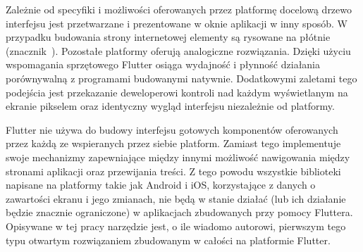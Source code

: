Zależnie od specyfiki i możliwości oferowanych przez platformę docelową drzewo interfejsu jest przetwarzane i prezentowane w oknie aplikacji w inny sposób. W przypadku budowania strony internetowej elementy są rysowane na płótnie (znacznik~). Pozostałe platformy oferują analogiczne rozwiązania. Dzięki użyciu wspomagania sprzętowego Flutter osiąga wydajność i płynność działania porównywalną z programami budowanymi natywnie. Dodatkowymi zaletami tego podejścia jest przekazanie deweloperowi kontroli nad każdym wyświetlanym na ekranie pikselem oraz identyczny wygląd interfejsu niezależnie od platformy.

Flutter nie używa do budowy interfejsu gotowych komponentów oferowanych przez każdą ze wspieranych przez siebie platform. Zamiast tego implementuje swoje mechanizmy zapewniające między innymi możliwość nawigowania między stronami aplikacji oraz przewijania treści. Z tego powodu wszystkie biblioteki napisane na platformy takie jak Android i iOS, korzystające z danych o zawartości ekranu i jego zmianach, nie będą w stanie działać (lub ich działanie będzie znacznie ograniczone) w aplikacjach zbudowanych przy pomocy Fluttera. Opisywane w tej pracy narzędzie jest, o ile wiadomo autorowi, pierwszym tego typu otwartym rozwiązaniem zbudowanym w całości na platformie Flutter.


